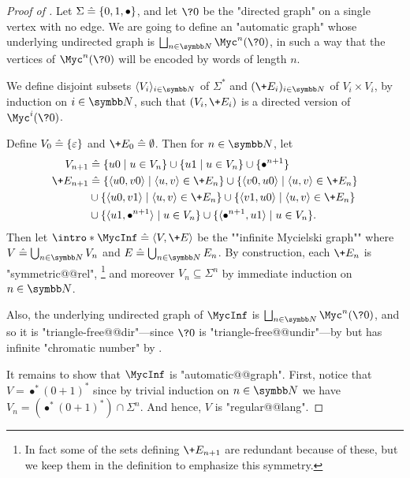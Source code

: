 \begin{proof}[Proof of ]
  Let $\Sigma \mathrel{\hat{=}} \{0,1,\bullet\}$, and let $\?0$ be the "directed
  graph" on a single vertex with no edge.
  We are going to define an "automatic graph" whose underlying undirected graph
  is $\bigdcup_{n\in\N} \Myc^n(\?0)$, in such a way that the vertices of $\Myc^n(\?0)$
  will be encoded by words of length $n$.

  We define
  disjoint subsets $\tup{V_i}_{i\in\N}$ of $\Sigma^*$
  and $(\+E_i)_{i\in\N}$ of $V_i \times V_i$, by induction on $i\in\N$,
  such that $(V_i, \+E_i)$ is a directed version of $\Myc^i(\?0)$.

  Define $V_0 \mathrel{\hat{=}} \{\varepsilon\}$ and $\+E_0 \defeq \emptyset$.
  Then for $n \in \N$, let
  \begin{align*}
    V_{n+1} & \defeq \{u0\mid u \in V_n\}\cup \{u1\mid u \in V_n\}\cup\{\bullet^{n+1}\}\\
    \+E_{n+1} & \defeq \{\langle u0,v0\rangle \mid \langle u,v\rangle \in \+E_n\}
		\cup \{\langle v0,u0\rangle \mid \langle u,v\rangle \in \+E_n\} \\
		& \cup \{\langle u0,v1\rangle \mid \langle u,v\rangle \in \+E_n\}
		\cup \{\langle v1,u0\rangle \mid \langle u,v\rangle \in \+E_n\} \\
    	& \cup \{\langle u1, \bullet^{n+1}\rangle \mid u\in V_n\}
		\cup \{\langle \bullet^{n+1}, u1\rangle \mid u\in V_n\}.
  \end{align*}
  Then let \AP$\intro*\MycInf \defeq \tup{V, \+E}$ be
  the ""infinite Mycielski graph"" where $V \defeq \bigcup_{n\in \N} V_n$
  and $E \defeq \bigcup_{n\in \N} E_n$.
  By construction, each $\+E_n$ is "symmetric@@rel",%
  \footnote{In fact some of the sets defining $\+E_{n+1}$ are redundant because of these,
  but we keep them in the definition to emphasize this symmetry.}
  and moreover $V_n \subseteq \Sigma^n$ by immediate induction on $n\in\N$.

  Also, the underlying undirected graph of $\MycInf$ is
  $\bigdcup_{n\in\N} \Myc^n(\?0)$, and so it is "triangle-free@@dir"---since $\?0$ is "triangle-free@@undir"---by  but has infinite
  "chromatic number" by . 
  
  It remains to show that $\MycInf$ is "automatic@@graph".
  First, notice that $V = \bullet^*(0+1)^*$ since by trivial induction
  on $n\in\N$ we have $V_n = (\bullet^*(0+1)^*)\cap \Sigma^n$. And hence,
  $V$ is "regular@@lang".


\end{proof}
